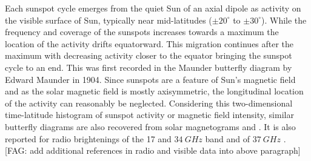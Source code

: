 \documentclass{aa}
\newcommand{\fag}[1]{\textcolor{midpurple}{[FAG: #1]}} %
\begin{document}
  Each sunspot cycle emerges from the quiet Sun of an axial dipole as
  activity on the visible surface of Sun, typically near mid-latitudes
  ($\pm20^{\circ}$ to $\pm 30^{\circ}$).
  While the frequency and coverage of the sunspots increases towards a maximum
  the location of the activity drifts equatorward. 
  This migration continues after the maximum with decreasing activity
  closer to the equator bringing the sunspot cycle to an end.
  This was first recorded in the Maunder butterfly diagram by Edward Maunder
  in 1904.
  Since sunspots are a feature of Sun's magnetic field and as the solar
  magnetic field is mostly axisymmetric, 
  the longitudinal location of the
  activity can reasonably be neglected.
  Considering this two-dimensional time-latitude histogram of sunspot activity
  or magnetic field intensity, similar butterfly 
  diagrams are also recovered from solar magnetograms
  \citep{GHHZ83,VLMCS12}
  and \citep[][and references therein]{LUSDADM17}.
  It is also reported for radio brightenings of the 17 and $\SI{34}{GHz}$ band
  \citep{Shibasaki13,SCGVPS14} and of $\SI{37}{GHz}$ \citep{metsahovi40}.
  \fag{add additional references in radio and visible data into above paragraph}
 
 
 
\end{document}
